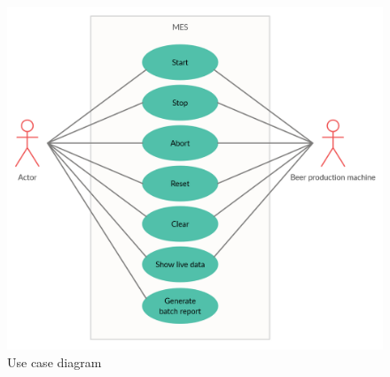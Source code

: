 \begin{figure}[ht]
	\centering 
	\includegraphics[scale=0.3]{images/ucdiagram.png}
	\caption{Use case diagram}
	\label{figure:ucdiagram} 
\end{figure}